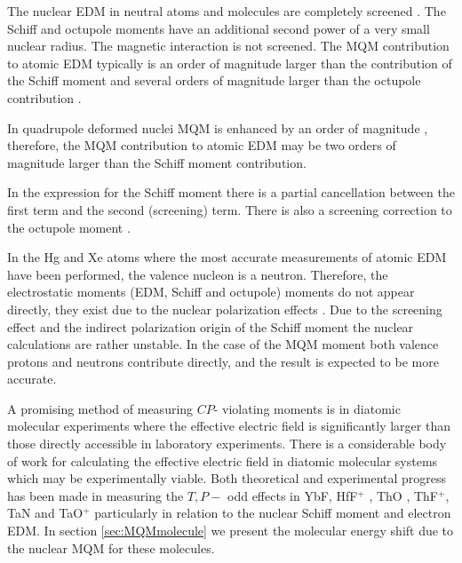 \documentclass[10pt,a4paper, twoside]{report}
\begin{document}
The nuclear EDM  in neutral atoms and molecules are completely screened \cite{Schiff1963}. The Schiff and octupole moments have an additional second power of a very small nuclear radius. The magnetic interaction is not screened. The MQM contribution to atomic EDM typically is an order of magnitude larger than the contribution of the Schiff moment and several orders of magnitude larger than the octupole contribution \cite{SFK1984, Flambaum1997}.  

In quadrupole deformed nuclei MQM is enhanced by an order of magnitude \cite{Flambaum1994}, therefore, the MQM contribution to atomic EDM may be two orders of magnitude larger than the Schiff moment contribution.

In the expression for the Schiff moment there is a partial cancellation between the first term and the second (screening) term. There is also a screening correction to the octupole moment \cite{ Flambaum1986, SFK1984, Flambaum2012}.

 In the Hg and Xe atoms  where the most accurate measurements of atomic EDM have been performed, the valence nucleon is a neutron. Therefore, the electrostatic moments (EDM, Schiff and octupole) moments do not appear directly, they exist due to the nuclear polarization effects \cite{Flambaum1986}. Due to the screening effect and the indirect polarization origin of the Schiff moment the nuclear calculations are rather unstable.
In the case of the MQM moment both valence protons and neutrons  contribute directly, and the result is expected to be more accurate\cite{Flambaum2014}.  


 A promising method of measuring $CP$- violating moments is in diatomic molecular experiments where the effective electric field is significantly larger than those directly accessible in laboratory experiments.  There is a considerable body of work for calculating the effective electric field in diatomic molecular systems which may be experimentally viable. Both theoretical and experimental progress has been made in measuring the $T,P-$ odd effects in  YbF\cite{Hudson2011, Mosyagin1998, Quiney1998, Parpia1998, Kozlov1994, Nayak2009, Steimle2007, Abe2014}, HfF$^+$ \cite{Cossel2012, Loh2013, Petrov2007, Fleig2013, Meyer2006, Skripnikov2008Hf, Le2013, Skripnikov2017Hf, Cairncross2017}, ThO \cite{Petrov2014, Meyer2008, Skripnikov2013ThO, Skripnikov2014ThO, Titov2015ThO, Fleig2014, Denis2016, Baron2017}, ThF$^+$\cite{Loh2013, Skripnikov2015Th, Denis2015}, TaN \cite{Skripnikov2015Ta, Fleig2016TaN} and TaO$^+$ \cite{Fleig2018} particularly in relation to the nuclear Schiff moment and electron EDM.   In section \ref{sec:MQMmolecule} we present the molecular energy shift due to the nuclear MQM for these molecules.
 
\end{document}
